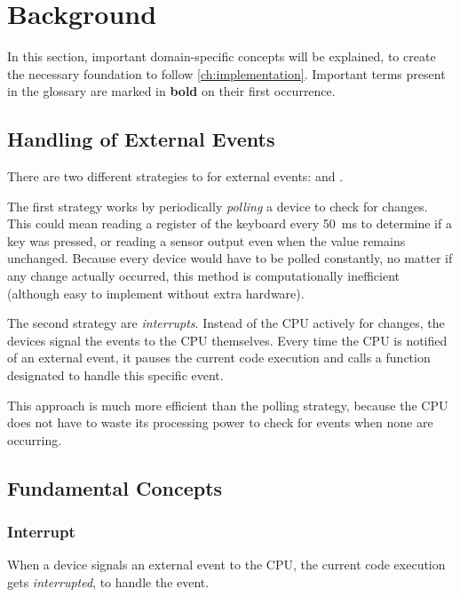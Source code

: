 \chapter{Background}
\label{ch:background}

In this section, important domain-specific concepts will be explained, to create the necessary foundation to follow \autoref{ch:implementation}.
Important terms present in the glossary are marked in \textbf{bold} on their first occurrence.

\clearpage

\section{Handling of External Events}
\label{sec:eventhandling}

There are two different strategies to  for external events:  and .

The first strategy works by periodically \textit{polling} a device to check for changes.
This could mean reading a register of the keyboard every \SI{50}{\milli\second} to determine if a key was pressed, or reading a sensor output even when the value remains unchanged.
Because every device would have to be polled constantly, no matter if any change actually occurred, this method is computationally inefficient (although easy to implement without extra hardware).

The second strategy are \textit{interrupts}.
Instead of the CPU actively  for changes, the devices signal the events to the CPU themselves.
Every time the CPU is notified of an external event, it pauses the current code execution and calls a function designated to handle this specific event.

This approach is much more efficient than the polling strategy, because the CPU does not have to waste its processing power to check for events when none are occurring.

\section{Fundamental Concepts}
\label{sec:fundamentals}

\subsection{Interrupt}
\label{subsec:interrupt}

When a device signals an external event to the CPU, the current code execution gets \textit{interrupted}, to handle the event.

